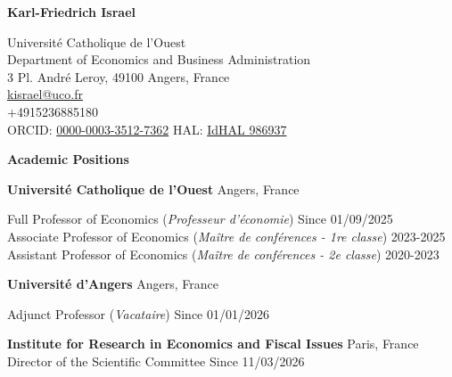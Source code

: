 \documentclass[11pt]{article}
\begin{document}
\begin{center}
    \textbf{Karl-Friedrich Israel}\\ 
    \hrulefill
\end{center}

\begin{center}
    Université Catholique de l'Ouest \\ Department of Economics and Business Administration \\
3 Pl. André Leroy,
49100 Angers, France \\
    \href{mailto:kisrael@uco.fr}{kisrael@uco.fr}  \\ +4915236885180 \\
    ORCID: \href{https://orcid.org/0000-0003-3512-7362}{0000-0003-3512-7362} \quad HAL: \href{https://cv.hal.science/986937}{IdHAL 986937}
\end{center}

\vspace{12pt}

\begin{center}
    \textbf{Academic Positions}
\end{center}

\vspace{12pt}

\textbf{Université Catholique de l'Ouest}  \hfill Angers, France

Full Professor of Economics (\textit{Professeur d'économie}) \hfill Since 01/09/2025 \\
\hspace*{.5cm} Associate Professor of Economics (\textit{Maître de conférences - 1re classe}) \hfill 2023-2025 \\
\hspace*{.5cm} Assistant Professor of Economics (\textit{Maître de conférences - 2e classe}) \hfill 2020-2023 \\

\vspace{4pt}

\textbf{Université d'Angers}  \hfill Angers, France

Adjunct Professor (\textit{Vacataire}) \hfill Since 01/01/2026 \\

\vspace{4pt}

\textbf{Institute for Research in Economics and Fiscal Issues}  \hfill Paris, France \\
Director of the Scientific Committee  \hfill Since 11/03/2026 \\
\end{document}
